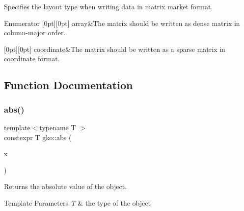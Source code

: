 Specifies the layout type when writing data in matrix market format. 

\begin{DoxyEnumFields}{Enumerator}
[0pt][0pt]{}\mbox{\label{namespacegko_ae749a5ea11a93c1bcc9158d9a6e9fb68af1f713c9e000f5d3f280adbd124df4f5}} 
array&The matrix should be written as dense matrix in column-\/major order. \\
\hline

[0pt][0pt]{}\mbox{\label{namespacegko_ae749a5ea11a93c1bcc9158d9a6e9fb68af5d7aa3ba4929cc12dc51a92c59fabd3}} 
coordinate&The matrix should be written as a sparse matrix in coordinate format. \\
\hline

\end{DoxyEnumFields}


\subsection{Function Documentation}
\mbox{\label{namespacegko_a57797fc0a00fd4b7ff34ca4bfc84bc51}} 
\subsubsection{\texorpdfstring{abs()}{abs()}}
{\footnotesize\ttfamily template$<$typename T $>$ \\
constexpr T gko\+::abs (\begin{DoxyParamCaption}\item[{const T \&}]{x }\end{DoxyParamCaption})\hspace{0.3cm}{\ttfamily [inline]}}



Returns the absolute value of the object. 


\begin{DoxyTemplParams}{Template Parameters}
{\em T} & the type of the object\\
\hline
\end{DoxyTemplParams}

